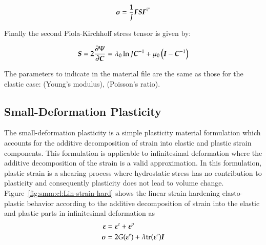 \begin{equation}
  \boldsymbol{\sigma } = \frac{1}{J}\boldsymbol{F}\boldsymbol{S}\boldsymbol{F}^T
\end{equation}

Finally the second Piola-Kirchhoff stress tensor is given by:

\begin{equation}
  \boldsymbol{S}  = 2\frac{\partial\Psi}{\partial\boldsymbol{C}} = \lambda_0\ln J
  \boldsymbol{C}^{-1}+\mu_0\left(\boldsymbol{I}-\boldsymbol{C}^{-1}\right)
\end{equation}

The parameters to indicate in the material file are the same
as those for the elastic case:  (Young's modulus),  (Poisson's
ratio).

\subsection{Small-Deformation Plasticity}


The small-deformation plasticity is a simple plasticity material
formulation which accounts for the additive decomposition of strain
into elastic and plastic strain components. This formulation is
applicable to infinitesimal deformation where the additive
decomposition of the strain is a valid approximation. In this
formulation, plastic strain is a shearing process where hydrostatic
stress has no contribution to plasticity and consequently plasticity
does not lead to volume change. Figure~\ref{fig:smm:cl:Lin-strain-hard}
shows the linear strain hardening elasto-plastic behavior according to
the additive decomposition of strain into the elastic and plastic
parts in infinitesimal deformation as
\begin{align}
  \boldsymbol{\varepsilon} &= \boldsymbol{\varepsilon}^e +\boldsymbol{\varepsilon}^p\\
  {\boldsymbol{\sigma}} &= 2G(\boldsymbol{\varepsilon}^e) + \lambda  \mathrm{tr}(\boldsymbol{\varepsilon}^e)\boldsymbol{I}
\end{align}

